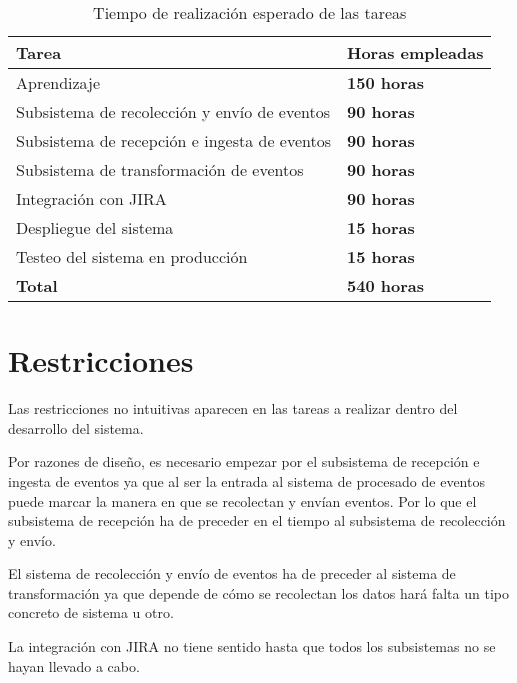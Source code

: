 \begin{table}[H]
	\centering
	\begin{tabular}{|l|l|}
		\hline
		\textbf{Tarea}                               & \textbf{Horas empleadas}                  \\ \hline
		Aprendizaje                                  & \textbf{150 horas}                        \\ \hline
		Subsistema de recolección y envío de eventos & \textbf{90 horas}                         \\ \hline
		Subsistema de recepción e ingesta de eventos & \textbf{90 horas}                         \\ \hline
		Subsistema de transformación de eventos      & \textbf{90 horas}                         \\ \hline
		Integración con JIRA                         & \textbf{90 horas}                         \\ \hline
		Despliegue del sistema                       & \textbf{15 horas}                         \\ \hline
		Testeo del sistema en producción             & \textbf{15 horas}                         \\ \hline
		\textbf{Total}                               & \textbf{540 horas}                        \\ \hline
	\end{tabular}
	\caption{Tiempo de realización esperado de las tareas}
\end{table}

\section{Restricciones}
Las restricciones no intuitivas aparecen en las tareas a realizar dentro del desarrollo del sistema. 

Por razones de diseño, es necesario empezar por el subsistema de recepción e ingesta de eventos ya que al ser la entrada al sistema de procesado de eventos puede marcar la manera en que se recolectan y envían eventos. Por lo que el subsistema de recepción ha de preceder en el tiempo al subsistema de recolección y envío.

El sistema de recolección y envío de eventos ha de preceder al sistema de transformación ya que depende de cómo se recolectan los datos hará falta un tipo concreto de sistema u otro.

La integración con JIRA no tiene sentido hasta que todos los subsistemas no se hayan llevado a cabo.

